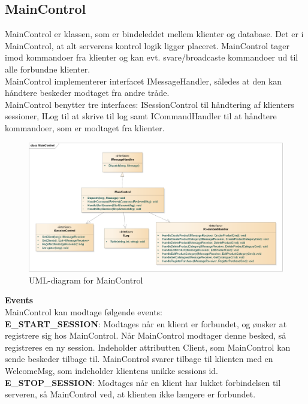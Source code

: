 \subsection{MainControl}
MainControl er klassen, som er bindeleddet mellem klienter og database. Det er i MainControl, at alt serverens kontrol logik ligger placeret. MainControl tager imod kommandoer fra klienter og kan evt. svare/broadcaste kommandoer ud til alle forbundne klienter.\\

MainControl implementerer interfacet IMessageHandler, således at den kan håndtere beskeder modtaget fra andre tråde.\\

MainControl benytter tre interfaces: ISessionControl til håndtering af klienters sessioner, ILog til at skrive til log samt ICommandHandler til at håndtere kommandoer, som er modtaget fra klienter.

\begin{figure}[H]
    \centering
    \includegraphics[width=1\textwidth]{Systemdesign/CentralServer/Images/MainControl.png}
    \caption{UML-diagram for MainControl}
    \label{fig:CSMainControl}
\end{figure}


\textbf{Events}\\
MainControl kan modtage følgende events:\\

\textbf{E\_START\_SESSION}:
Modtages når en klient er forbundet, og ønsker at registrere sig hos MainControl. Når MainControl modtager denne besked, så registreres en ny session. Indeholder attributten Client, som MainControl kan sende beskeder tilbage til. MainControl svarer tilbage til klienten med en WelcomeMsg, som indeholder klientens unikke sessions id.\\

\textbf{E\_STOP\_SESSION}:
Modtages når en klient har lukket forbindelsen til serveren, så MainControl ved, at klienten ikke længere er forbundet.\\

